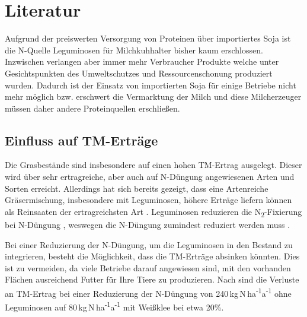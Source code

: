 
\section{Literatur}
\label{sec:Literatur}

Aufgrund der preiswerten Versorgung von Proteinen über importiertes Soja ist die N-Quelle Leguminosen für Milchkuhhalter bisher kaum erschlossen.
Inzwischen verlangen aber immer mehr Verbraucher Produkte welche unter Gesichtspunkten des Umweltschutzes und Ressourcenschonung produziert wurden.
Dadurch ist der Einsatz von importierten Soja für einige Betriebe nicht mehr möglich bzw. erschwert die Vermarktung der Milch und diese Milcherzeuger müssen daher andere Proteinquellen erschließen.

\subsection{Einfluss auf \acl{TM}-Erträge}
\label{subsec:TM}

Die Grasbestände sind insbesondere auf einen hohen \ac{TM}-Ertrag ausgelegt.
Dieser wird über sehr ertragreiche, aber auch auf N-Düngung angewiesenen Arten und Sorten erreicht.
Allerdings hat sich bereits gezeigt, dass eine Artenreiche Gräsermischung, insbesondere mit Leguminosen, höhere Erträge liefern können als Reinsaaten der ertragreichsten Art \parencite{nyfeler2009strong}.
Leguminosen reduzieren die N\textsubscript{2}-Fixierung bei N-Düngung \parencite{ledgard2001nitrogen}, weswegen die N-Düngung zumindest reduziert werden muss \parencite[34]{weggler2050leguminosen}.

Bei einer Reduzierung der N-Düngung, um die Leguminosen in den Bestand zu integrieren, besteht die Möglichkeit, dass die \ac{TM}-Erträge absinken könnten.
Dies ist zu vermeiden, da viele Betriebe darauf angewiesen sind, mit den vorhanden Flächen ausreichend Futter für Ihre Tiere zu produzieren.
Nach \textcite[11]{engel2013protein} sind die Verluste an \ac{TM}-Ertrag bei einer Reduzierung der N-Düngung von 240\,kg\,N\,ha\textsuperscript{-1}a\textsuperscript{-1} ohne Leguminosen auf 80\,kg\,N\,ha\textsuperscript{-1}a\textsuperscript{-1} mit Weißklee bei etwa 20\%.

